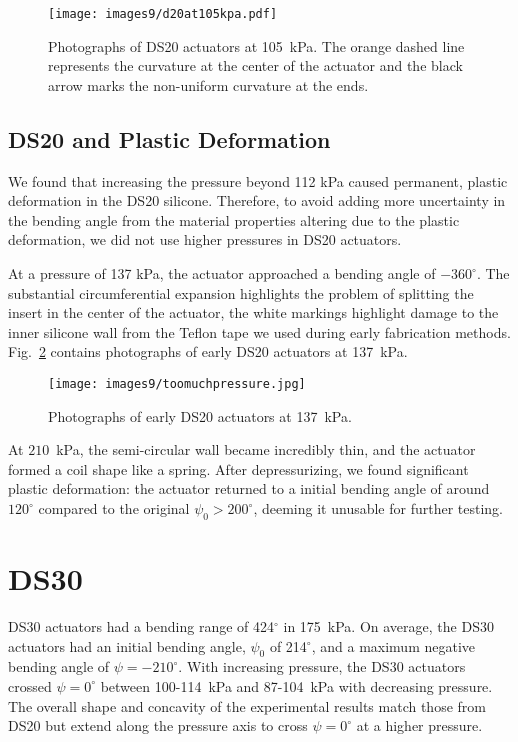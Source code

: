 \begin{figure}[!ht]
    \centering
     \texttt{[image: images9/d20at105kpa.pdf]}
    \caption{Photographs of DS20 actuators at 105~kPa. The orange dashed line represents the curvature at the center of the actuator and the black arrow marks the non-uniform curvature at the ends.}
    \label{fig:d20at105kpa}
\end{figure}

\subsection{DS20 and Plastic Deformation}

We found that increasing the pressure beyond 112 kPa caused permanent, plastic deformation in the DS20 silicone. Therefore, to avoid adding more uncertainty in the bending angle from the material properties altering due to the plastic deformation, we did not use higher pressures in DS20 actuators. 

At a pressure of 137 kPa, the actuator approached a bending angle of $-360^\circ$. The substantial circumferential expansion highlights the problem of splitting the insert in the center of the actuator, the white markings highlight damage to the inner silicone wall from the Teflon tape we used during early fabrication methods. Fig.~\ref{fig:toomuchpressure} contains photographs of early DS20 actuators at 137~kPa.  
\\
\begin{figure}[!ht]
    \centering
     \texttt{[image: images9/toomuchpressure.jpg]}
    \caption{Photographs of early DS20 actuators at 137~kPa.}
    \label{fig:toomuchpressure}
\end{figure}

At $210$~kPa, the semi-circular wall became incredibly thin, and the actuator formed a coil shape like a spring. After depressurizing, we found significant plastic deformation: the actuator returned to a initial bending angle of around $120^\circ$ compared to the original $\psi_0>200^\circ$, deeming it unusable for further testing. 

\clearpage
\section{DS30}

DS30 actuators had a bending range of 424$^\circ$ in 175~kPa. On average, the DS30 actuators had an initial bending angle, $\psi_0$ of 214$^\circ$, and a maximum negative bending angle of $\psi=-210^\circ$. With increasing pressure, the DS30 actuators crossed $\psi=0^\circ$ between 100-114~kPa and 87-104~kPa with decreasing pressure. The overall shape and concavity of the experimental results match those from DS20 but extend along the pressure axis to cross $\psi=0^\circ$ at a higher pressure. 

